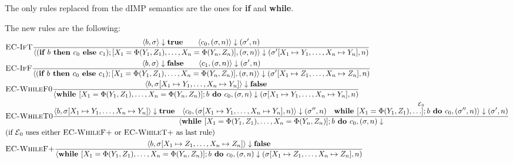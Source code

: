 The only rules replaced from the dIMP semantics are the ones for \textbf{if} and 
\textbf{while}.
\begin{landscape}
    The new rules are the following:
    \begin{align*}
        &\textsc{EC-IfT}
        \ddfrac{\langle b, \sigma \rangle \downarrow \textbf{true}
        \qquad\langle c_0, (\sigma, n) \rangle \downarrow (\sigma', n)}
        {\langle (\textbf{if }b\textbf{ then } c_0 \textbf{ else }c_1);
        [X_1= \Phi(Y_1, Z_1), \ldots, X_n = \Phi(Y_n, Z_n)], (\sigma, n) \rangle
        \downarrow (\sigma'[X_1 \mapsto Y_1, \ldots, X_n \mapsto Y_n], n)}\\
        &\textsc{EC-IfF}
        \ddfrac{\langle b, \sigma \rangle \downarrow \textbf{false}
        \qquad\langle c_1, (\sigma, n) \rangle  \downarrow (\sigma', n)}
        {\langle (\textbf{if }b\textbf{ then } c_0 \textbf{ else }c_1);
        [X_1= \Phi(Y_1, Z_1), \ldots, X_n = \Phi(Y_n, Z_n)], (\sigma, n) \rangle
        \downarrow (\sigma'[X_1 \mapsto Z_1, \ldots, X_n \mapsto Z_n], n)}\\
        &\textsc{EC-WhileF0}\ddfrac
        {\langle b, \sigma[X_1 \mapsto Y_1, \ldots, X_n \mapsto Y_n] \rangle \downarrow \textbf{false}}
        {\langle \textbf{while }[X_1= \Phi(Y_1, Z_1), \ldots, X_n = \Phi(Y_n, Z_n)];
        b \textbf{ do } c_0, (\sigma, n) 
        \downarrow (\sigma[X_1 \mapsto Y_1, \ldots, X_n \mapsto Y_n], n)}\\
        &\textsc{EC-WhileT0}\ddfrac
        {\langle b, \sigma[X_1 \mapsto Y_1, \ldots, X_n \mapsto Y_n] \rangle \downarrow \textbf{true}
        \quad \langle c_0, (\sigma[X_1 \mapsto Y_1, \ldots, X_n \mapsto Y_n], n) \rangle \downarrow (\sigma'', n)
        \quad \overset{\E_0}{\textbf{while }[X_1= \Phi(Y_1, Z_1), \ldots];%
        b \textbf{ do } c_0, (\sigma'', n) \rangle \downarrow (\sigma', n) }}
        {\langle \textbf{while }[X_1= \Phi(Y_1, Z_1), \ldots, X_n = \Phi(Y_n, Z_n)];
        b \textbf{ do } c_0, (\sigma, n) 
        \downarrow }\\
        &\text{(if $\E_0$ uses either \textsc{EC-WhileF+} or \textsc{EC-WhileT+} as last rule)}\\
        &\textsc{EC-WhileF+}\ddfrac
        {\langle b, \sigma[X_1 \mapsto Z_1, \ldots, X_n \mapsto Z_n] \rangle \downarrow \textbf{false}}
        {\langle \textbf{while }[X_1= \Phi(Y_1, Z_1), \ldots, X_n = \Phi(Y_n, Z_n)];
        b \textbf{ do } c_0, (\sigma, n) 
        \downarrow (\sigma[X_1 \mapsto Z_1, \ldots, X_n \mapsto Z_n], n)}\\

\end{align*}
\end{landscape}
